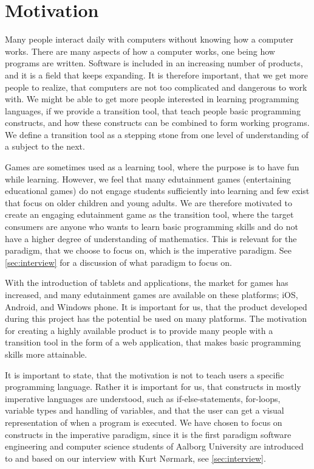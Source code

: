 \section{Motivation}
\label{sec:motivation}

Many people interact daily with computers without knowing how a computer works.
There are many aspects of how a computer works, one being how programs are written.
Software is included in an increasing number of products, and it is a field that keeps expanding.\cite{idaArtikelMangel}
It is therefore important, that we get more people to realize, that computers are not too complicated and dangerous to work with.
We might be able to get more people interested in learning programming languages, if we provide a transition tool, that teach people basic programming constructs, and how these constructs can be combined to form working programs.
We define a transition tool as a stepping stone from one level of understanding of a subject to the next.\newline

Games are sometimes used as a learning tool, where the purpose is to have fun while learning.
However, we feel that many edutainment games (entertaining educational games) do not engage students sufficiently into learning and few exist that focus on older children and young adults. 
We are therefore motivated to create an engaging edutainment game as the transition tool, where the target consumers are anyone who wants to learn basic programming skills and do not have a higher degree of understanding of mathematics. This is relevant for the paradigm, that we choose to focus on, which is the imperative paradigm. See \autoref{sec:interview} for a discussion of what paradigm to focus on.\newline

With the introduction of tablets and applications, the market for games has increased, and many edutainment games are available on these platforms; iOS, Android, and Windows phone.
It is important for us, that the product developed during this project has the potential be used on many platforms.
The motivation for creating a highly available product is to provide many people with a transition tool in the form of a web application, that makes basic programming skills more attainable.\newline

It is important to state, that the motivation is not to teach users a specific programming language.
Rather it is important for us, that constructs in mostly imperative languages are understood, such as if-else-statements, for-loops, variable types and handling of variables, and that the user can get a visual representation of when a program is executed. We have chosen to focus on constructs in the imperative paradigm, since it is the first paradigm software engineering and computer science students of Aalborg University are introduced to and based on our interview with Kurt N{\o}rmark, see \autoref{sec:interview}.\newline

